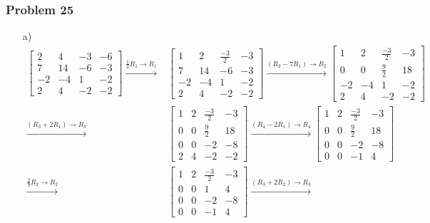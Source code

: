 \documentclass[a4paper,12pt]{article}
\begin{document}
\subsubsection*{Problem 25}
\begin{itemize}
\item[a)] \begin{align*}
    \begin{bmatrix}
      2 & 4 & -3 &-6\\
      7 & 14 & -6 &-3\\
      -2 & -4 & 1 &-2\\
      2&4&-2&-2
    \end{bmatrix} \xrightarrow{{\frac{1}{2}R_1}\to{R_1}}&
    \begin{bmatrix}
      1 & 2 & \frac{-3}{2} &-3\\
      7 & 14 & -6 &-3\\
      -2 & -4 & 1 &-2\\
      2&4&-2&-2
    \end{bmatrix} \xrightarrow{{(R_2-7R_1)}\to{R_2}}
    \begin{bmatrix}
      1 & 2 & \frac{-3}{2} &-3\\
      0 & 0 & \frac{9}{2} &18\\
      -2 & -4 & 1 &-2\\
      2&4&-2&-2
    \end{bmatrix}\\ \xrightarrow{{(R_3+2R_1)}\to{R_3}}&
    \begin{bmatrix}
      1 & 2 & \frac{-3}{2} &-3\\
      0 & 0 & \frac{9}{2} &18\\
      0 & 0 & -2 &-8\\
      2&4&-2&-2
    \end{bmatrix} \xrightarrow{{(R_4-2R_1)}\to{R_4}}
    \begin{bmatrix}
      1 & 2 & \frac{-3}{2} &-3\\
      0 & 0 & \frac{9}{2} &18\\
      0 & 0 & -2 &-8\\
      0&0&-1&4
    \end{bmatrix} \\ \xrightarrow{{\frac{2}{9}}R_2\to{R_2}}&
    \begin{bmatrix}
      1 & 2 & \frac{-3}{2} &-3\\
      0 & 0 & 1 &4\\
      0 & 0 & -2 &-8\\
      0&0&-1&4
    \end{bmatrix} \xrightarrow{{(R_3+2R_2)}\to{R_3}}

\end{align*}
\end{itemize}
\end{document}
